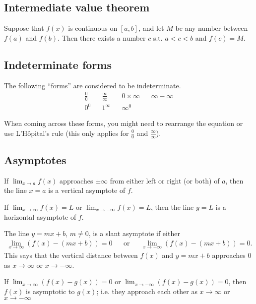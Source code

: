 \documentclass[main.tex]{subfiles}
\begin{document}
	\subsection*{Intermediate value theorem}
	\begin{theorem}
	Suppose that \(f(x)\) is continuous on \([a, b]\), and let \(M\) be any number between \(f(a)\) and \(f(b)\). Then there exists a number \(c\) s.t. \(a < c < b\) and \(f(c) = M\).
	\end{theorem}

	\subsection*{Indeterminate forms}
	The following ``forms'' are considered to be indeterminate.
	\begin{align*}
		\frac{0}{0} && \frac{\infty}{\infty} && 0 \times \infty && \infty - \infty\\
		0^0 && 1^\infty && \infty^0
	\end{align*}

	When coming across these forms, you might need to rearrange the equation or use L'Hôpital's rule (this only applies for \(\frac{0}{0}\) and \(\frac{\infty}{\infty}\)).

	\subsection*{Asymptotes}
	\begin{definition}
		If \(\lim_{x \to a}{f(x)}\) approaches \(\pm \infty\) from either left or right (or both) of \(a\), then the line \(x = a\) is a vertical asymptote of \(f\).
	\end{definition}
	\begin{definition}
		If \(\lim_{x \to \infty}{f(x)} = L\) or \(\lim_{x \to -\infty}{f(x)} = L\), then the line \(y = L\) is a horizontal asymptote of \(f\).
	\end{definition}
	\begin{definition}
		The line \(y = mx + b\), \(m \neq 0\), is a slant asymptote if either
		\[
			\begin{aligned}
			\lim_{x \to \infty} (f(x) - (mx + b)) = 0 && \text{or} && \lim_{x \to -\infty} (f(x) - (mx + b)) = 0.
			\end{aligned}
		\]
		This says that the vertical distance between \(f(x)\) and \(y = mx + b\) approaches 0 as \(x \to \infty\) or \(x \to -\infty\).
	\end{definition}
	\begin{definition}
	If \(\lim_{x \to \infty} (f(x) - g(x)) = 0\) or \(\lim_{x \to -\infty} (f(x) - g(x)) = 0\), then \(f(x)\) is asymptotic to \(g(x)\); i.e. they approach each other as \(x \to \infty\) or \(x \to -\infty\)
	\end{definition}
\end{document}
